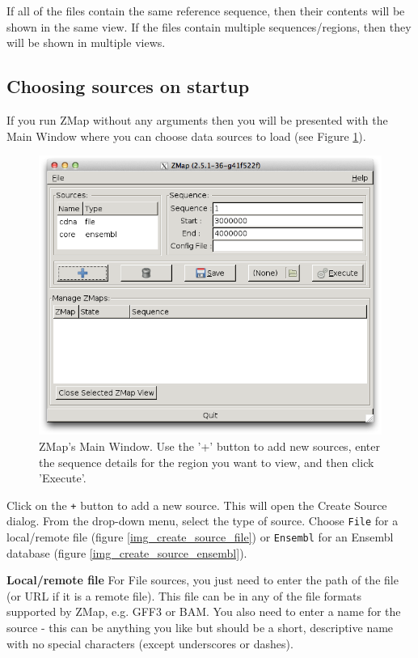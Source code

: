 \documentclass[letterpaper]{article}
\newcounter{Figure}
\begin{document}
If all of the files contain the same reference sequence, then their contents will be shown in the same view. If the files contain multiple sequences/regions, then they will be shown in multiple views.

\subsection{Choosing sources on startup}
If you run ZMap without any arguments then you will be presented with the Main Window where you can choose data sources to load (see Figure \ref{img_main_window}).

\begin{figure}
\centering
\color[rgb]{0.30980393,0.5058824,0.7411765}
\includegraphics[resolution=150]{images/main_window.png}
\caption{ZMap's Main Window. Use the '+' button to add new sources, enter the sequence details for the region you want to view, and then click 'Execute'.}
\label{img_main_window}
\end{figure}

Click on the \lstinline{+} button to add a new source. This will open the Create Source dialog. From the drop-down menu, select the type of source. Choose \lstinline{File} for a local/remote file (figure \ref{img_create_source_file}) or \lstinline{Ensembl} for an Ensembl database (figure \ref{img_create_source_ensembl}).

\textbf{Local/remote file}
For File sources, you just need to enter the path of the file (or URL if it is a remote file). This file can be in any of the file formats supported by ZMap, e.g. GFF3 or BAM. You also need to enter a name for the source - this can be anything you like but should be a short, descriptive name with no special characters (except underscores or dashes).
\end{document}
